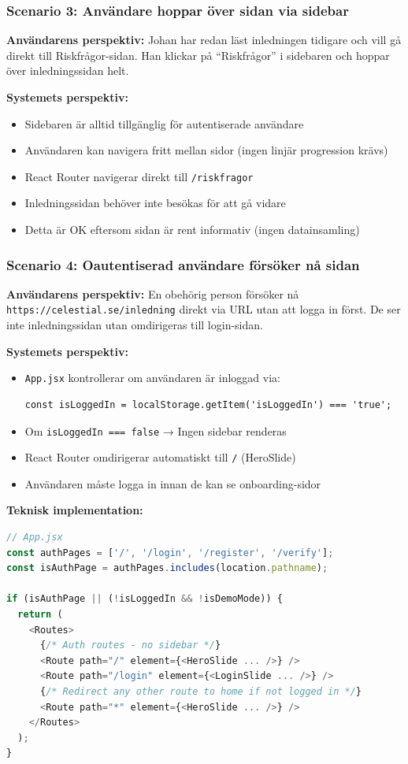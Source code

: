 \documentclass[12pt,a4paper]{article}
\begin{document}
\subsubsection{Scenario 3: Användare hoppar över sidan via sidebar}

\textbf{Användarens perspektiv:}
Johan har redan läst inledningen tidigare och vill gå direkt till Riskfrågor-sidan. Han klickar på ``Riskfrågor'' i sidebaren och hoppar över inledningssidan helt.

\textbf{Systemets perspektiv:}
\begin{itemize}[noitemsep]
  \item Sidebaren är alltid tillgänglig för autentiserade användare
  \item Användaren kan navigera fritt mellan sidor (ingen linjär progression krävs)
  \item React Router navigerar direkt till \texttt{/riskfragor}
  \item Inledningssidan behöver inte besökas för att gå vidare
  \item Detta är OK eftersom sidan är rent informativ (ingen datainsamling)
\end{itemize}

\subsubsection{Scenario 4: Oautentiserad användare försöker nå sidan}

\textbf{Användarens perspektiv:}
En obehörig person försöker nå \texttt{https://celestial.se/inledning} direkt via URL utan att logga in först. De ser inte inledningssidan utan omdirigeras till login-sidan.

\textbf{Systemets perspektiv:}
\begin{itemize}[noitemsep]
  \item \texttt{App.jsx} kontrollerar om användaren är inloggad via:
  \begin{verbatim}
const isLoggedIn = localStorage.getItem('isLoggedIn') === 'true';
  \end{verbatim}
  \item Om \texttt{isLoggedIn === false} → Ingen sidebar renderas
  \item React Router omdirigerar automatiskt till \texttt{/} (HeroSlide)
  \item Användaren måste logga in innan de kan se onboarding-sidor
\end{itemize}

\textbf{Teknisk implementation:}
\begin{lstlisting}[language=javascript]
// App.jsx
const authPages = ['/', '/login', '/register', '/verify'];
const isAuthPage = authPages.includes(location.pathname);

if (isAuthPage || (!isLoggedIn && !isDemoMode)) {
  return (
    <Routes>
      {/* Auth routes - no sidebar */}
      <Route path="/" element={<HeroSlide ... />} />
      <Route path="/login" element={<LoginSlide ... />} />
      {/* Redirect any other route to home if not logged in */}
      <Route path="*" element={<HeroSlide ... />} />
    </Routes>
  );
}
\end{lstlisting}
\end{document}
